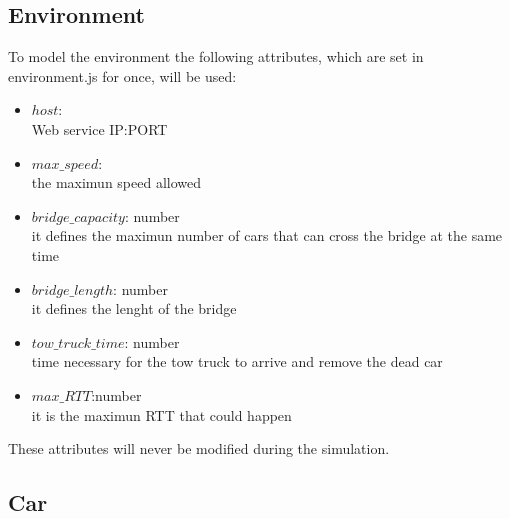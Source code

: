 \subsection{Environment}

To model the environment the following attributes, which are set in environment.js for once, will be used:
\begin{itemize}
    \item $host$:\\ Web service IP:PORT
    \item $max\_speed$:\\ the maximun speed allowed
    \item $bridge\_capacity$: number\\ it defines the maximun number of cars that can cross the bridge
    at the same time
    \item $bridge\_length$: number\\ it defines the lenght of the bridge
    \item $tow\_truck\_time$: number\\ time necessary for the tow truck to arrive and remove the dead car
    \item $max\_RTT$:number\\ it is the maximun RTT that could happen
\end{itemize}

These attributes will never be modified during the simulation.

\subsection{Car}

